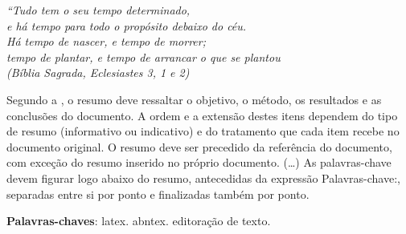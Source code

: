 \documentclass[
12pt, %
openright, %
oneside, %
a4paper, %
english, %
brazil, %
]{abntex2}
\begin{document}



\begin{epigrafe}
    \vspace*{\fill}
\begin{flushright}
\textit{``Tudo tem o seu tempo determinado, \\
e há tempo para todo o propósito debaixo do céu. \\
Há tempo de nascer, e tempo de morrer; \\
tempo de plantar, e tempo de arrancar o que se plantou\\
(Bíblia Sagrada, Eclesiastes 3, 1 e 2)}
\end{flushright}
\end{epigrafe}


\begin{resumo}
 Segundo a , o resumo deve ressaltar o
 objetivo, o método, os resultados e as conclusões do documento. A ordem e a extensão
 destes itens dependem do tipo de resumo (informativo ou indicativo) e do
 tratamento que cada item recebe no documento original. O resumo deve ser
 precedido da referência do documento, com exceção do resumo inserido no
 próprio documento. (\ldots) As palavras-chave devem figurar logo abaixo do
 resumo, antecedidas da expressão Palavras-chave:, separadas entre si por
 ponto e finalizadas também por ponto.

 \vspace{\onelineskip}
    
 \noindent
 \textbf{Palavras-chaves}: latex. abntex. editoração de texto.
\end{resumo}
\end{document}
